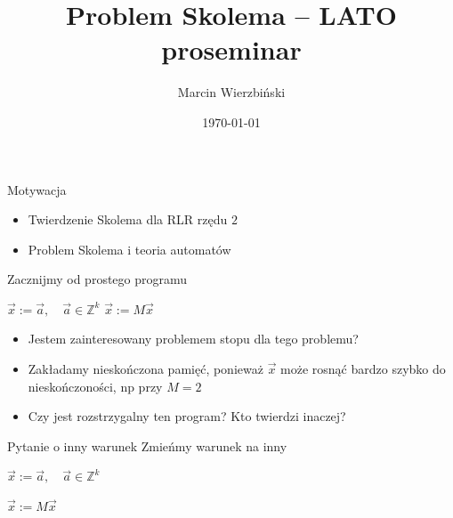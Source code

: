 \documentclass[handout]{beamer}
\title{Problem Skolema -- LATO proseminar}
\author{Marcin Wierzbiński}
\institute{MIMUW}
\date{\today}
\def\Z{\mathbb Z}
\theoremstyle{definition}
\theoremstyle{named}
\begin{document}
\frame{\titlepage}

\begin{frame}{Motywacja}
\begin{itemize}
    \item Twierdzenie Skolema dla RLR rzędu $2$
    \item Problem Skolema i teoria automatów
\end{itemize}
\end{frame}

\begin{frame}{Zacznijmy od prostego programu}
    \begin{algorithm}[H] 
        \begin{algorithmic}[l]
        \State $\vec{x} := \vec{a}, \quad \vec{a} \in \Z^{k}$  
          \State $\vec{x} := M \vec{x}$ \algorithmiccomment{$M \in \Z^{k \times k}$}
          
        \EndWhile
        \end{algorithmic}
    \end{algorithm}
    
    \begin{itemize}
    \pause 
    \item Jestem zainteresowany problemem stopu dla tego problemu? 
    
    
    \item  Zakładamy nieskończona pamięć, ponieważ $\vec{x}$ może rosnąć bardzo szybko do nieskończoności, np przy $M=2$
    \pause
    
    \item  Czy jest rozstrzygalny ten program? Kto twierdzi inaczej?
    \end{itemize}

\end{frame}

\begin{frame}{Pytanie o inny warunek}
    Zmieńmy warunek na inny 
    \begin{algorithm}[H] 
        \begin{algorithmic}[l]
        \State $\vec{x} := \vec{a},  \quad \vec{a} \in \Z^{k}$  

          \State $\vec{x} := M \vec{x}$ \algorithmiccomment{$M \in \Z^{k \times k}$}
          
        \EndWhile
        \end{algorithmic}
    \end{algorithm}
\end{frame}    
\end{document}
